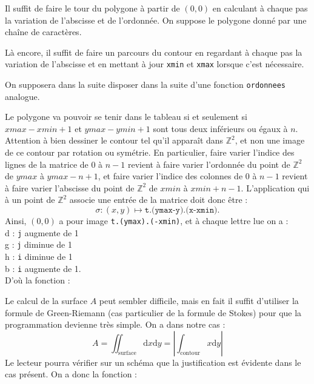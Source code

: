 \Corrige

\Q
Il suffit de faire le tour du polygone à partir de $(0,0)$ en calculant à chaque pas la variation de l'abscisse et de l'ordonnée. On suppose le polygone donné par une chaîne de caractères.



\Q
Là encore, il suffit de faire un parcours du contour en regardant à chaque pas la variation de l'abscisse et en mettant à jour \texttt{xmin} et \texttt{xmax} lorsque c'est nécessaire.
\newpage



On supposera dans la suite disposer dans la suite d'une fonction \texttt{ordonnees} analogue.

\Q
Le polygone va pouvoir se tenir dans le tableau si et seulement si $xmax - xmin + 1$ et $ymax - ymin + 1$ sont tous deux inférieurs ou égaux à $n$. Attention à bien dessiner le contour tel qu'il apparaît dans $\mathbb{Z}^2$, et non une image de ce contour par rotation ou symétrie. En particulier, faire varier l'indice des lignes de la matrice de 0 à $n-1$ revient à faire varier l'ordonnée du point de $\mathbb{Z}^2$ de $ymax$ à $ymax-n+1$, et faire varier l'indice des colonnes de 0 à $n-1$ revient à faire varier l'abscisse du point de $\mathbb{Z}^2$ de $xmin$ à $xmin+n-1$. L'application qui à un point de $\mathbb{Z}^2$ associe une entrée de la matrice doit donc être :
\[
    \sigma : (x,y) \mapsto \texttt{t.(ymax-y).(x-xmin)}.
\]
Ainsi, $(0,0)$ a pour image \texttt{t.(ymax).(-xmin)}, et à chaque lettre lue on a :\\
\og d \fg{} : \texttt{j} augmente de 1\\
\og g \fg{} : \texttt{j} diminue de 1\\
\og h \fg{} : \texttt{i} diminue de 1\\
\og b \fg{} : \texttt{i} augmente de 1.\\
D'où la fonction :



\Q
Le calcul de la surface $A$ peut sembler difficile, mais en fait il suffit d'utiliser la formule de Green-Riemann (cas particulier de la formule de Stokes) pour que la programmation devienne très simple. On a dans notre cas :
\[
    A = \iint_{\textrm{surface}}\textrm{d}x\textrm{d}y = \left|\int_{\textrm{contour}}x\textrm{d}y\right|
\]
Le lecteur pourra vérifier sur un schéma que la justification est évidente dans le cas présent. On a donc la fonction :


